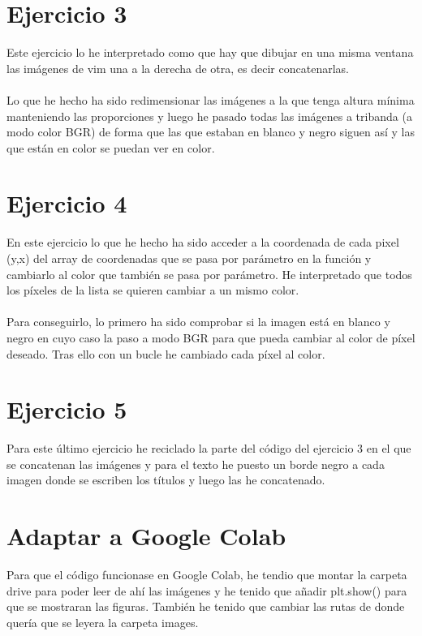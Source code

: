 \documentclass[12pt]{article}
\begin{document}
\section*{Ejercicio 3}
Este ejercicio lo he interpretado como que hay que dibujar en una misma ventana las imágenes de vim una a la derecha de otra, es decir concatenarlas.\\\\

Lo que he hecho ha sido redimensionar las imágenes a la que tenga altura mínima manteniendo las proporciones y luego he pasado todas las imágenes a tribanda (a modo color BGR) de forma que las que estaban en blanco y negro siguen así y las que están en color se puedan ver en color.

\section*{Ejercicio 4}
En este ejercicio lo que he hecho ha sido acceder a la coordenada de cada pixel (y,x) del array de coordenadas que se pasa por parámetro en la función y cambiarlo al color que también se pasa por parámetro. He interpretado que todos los píxeles de la lista se quieren cambiar a un mismo color.\\\\
Para conseguirlo, lo primero ha sido comprobar si la imagen está en blanco y negro en cuyo caso la paso a modo BGR para que pueda cambiar al color de píxel deseado. Tras ello con un bucle he cambiado cada píxel al color.

\section*{Ejercicio 5}
Para este último ejercicio he reciclado la parte del código del ejercicio 3 en el que se concatenan las imágenes y para el texto he puesto un borde negro a cada imagen donde se escriben los títulos y luego las he concatenado.

\section*{Adaptar a Google Colab}
Para que el código funcionase en Google Colab, he tendio que montar la carpeta drive para poder leer de ahí las imágenes y he tenido que añadir plt.show() para que se mostraran las figuras.
También he tenido que cambiar las rutas de donde quería que se leyera la carpeta images.

 
\end{document}
